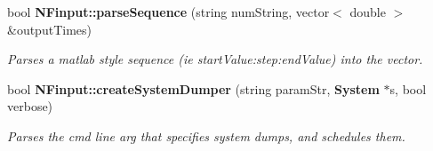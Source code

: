 \begin{CompactItemize}
bool {\bf NFinput::parseSequence} (string numString, vector$<$ double $>$ \&outputTimes)
\begin{CompactList}\small\item\em Parses a matlab style sequence (ie startValue:step:endValue) into the vector. \item\end{CompactList}\item 
bool {\bf NFinput::createSystemDumper} (string paramStr, {\bf System} $\ast$s, bool verbose)
\begin{CompactList}\small\item\em Parses the cmd line arg that specifies system dumps, and schedules them. \item\end{CompactList}\end{CompactItemize}
